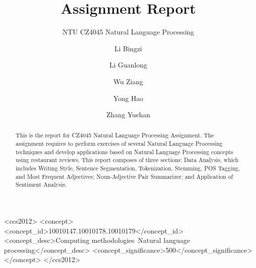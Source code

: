 \documentclass[sigconf]{acmart}
\begin{document}
\title{Assignment Report}
\subtitle{NTU CZ4045 Natural Language Processing}

\author{Li Bingzi}

\author{Li Guanlong}

\author{Wu Ziang}

\author{Yong Hao}

\author{Zhang Yuehan}


\begin{abstract}
This is the report for CZ4045 Natural Language Processing Assignment. The assignment requires to perform exercises of several Natural Language Processing techniques and develop applications based on Natural Language Processing concepts using restaurant reviews. This report composes of three sections: Data Analysis, which includes Writing Style, Sentence Segmentation, Tokenization, Stemming, POS Tagging, and Most Frequent Adjectives; Noun-Adjective Pair Summarizer; and Application of Sentiment Analysis.
\end{abstract}

\begin{CCSXML}
<ccs2012>
<concept>
<concept_id>10010147.10010178.10010179</concept_id>
<concept_desc>Computing methodologies~Natural language processing</concept_desc>
<concept_significance>500</concept_significance>
</concept>
</ccs2012>
\end{CCSXML}



\maketitle
\end{document}
